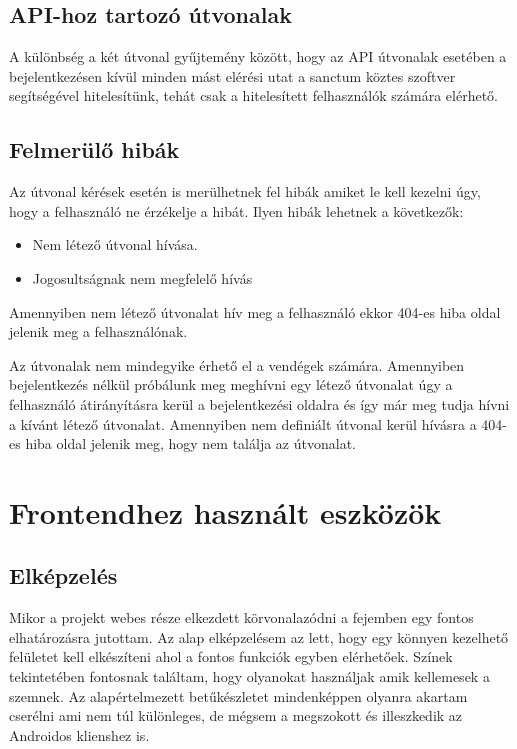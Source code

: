 \documentclass[
]{thesis-ekf}
\theoremstyle{definition}
\theoremstyle{remark}
\begin{document}
	\subsection{API-hoz tartozó útvonalak}
	A különbség a két útvonal gyűjtemény között, hogy az API útvonalak esetében a bejelentkezésen kívül minden mást elérési utat a sanctum köztes szoftver segítségével hitelesítünk, tehát csak a hitelesített felhasználók számára elérhető.
	
	\subsection{Felmerülő hibák}
	Az útvonal kérések esetén is merülhetnek fel hibák amiket le kell kezelni úgy, hogy a felhasználó ne érzékelje a hibát. Ilyen hibák lehetnek a következők:
	\begin{itemize}
		\item Nem létező útvonal hívása.
		\item Jogosultságnak nem megfelelő hívás
	\end{itemize}
	
	Amennyiben nem létező útvonalat hív meg a felhasználó ekkor 404-es hiba oldal jelenik meg a felhasználónak. 
	
	Az útvonalak nem mindegyike érhető el a vendégek számára. Amennyiben bejelentkezés nélkül próbálunk meg meghívni egy létező útvonalat úgy a felhasználó átirányításra kerül a bejelentkezési oldalra és így már meg tudja hívni a kívánt létező útvonalat. Amennyiben nem definiált útvonal kerül hívásra a 404-es hiba oldal jelenik meg, hogy nem találja az útvonalat.
	
	\section{Frontendhez használt eszközök}
	\subsection{Elképzelés}
	Mikor a projekt webes része elkezdett körvonalazódni a fejemben egy fontos elhatározásra jutottam. Az alap elképzelésem az lett, hogy egy könnyen kezelhető felületet kell elkészíteni ahol a fontos funkciók egyben elérhetőek. Színek tekintetében fontosnak találtam, hogy olyanokat használjak amik kellemesek a szemnek. Az alapértelmezett betűkészletet mindenképpen olyanra akartam cserélni ami nem túl különleges, de mégsem a megszokott és illeszkedik az Androidos klienshez is.
	
\end{document}
